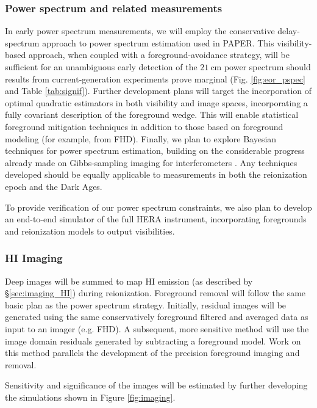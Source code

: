 \documentclass[preprint]{aastex}
\newcommand{\compress}{\vspace{-0.3in}}
\begin{document}

\compress
\subsubsection{Power spectrum and related measurements}

In early power spectrum measurements, we will employ the conservative delay-spectrum approach to power spectrum estimation used in PAPER.  This visibility-based approach, when coupled with a foreground-avoidance strategy, will be sufficient for an unambiguous early detection of the $21~\textrm{cm}$ power spectrum should results from current-generation experiments prove marginal (Fig. \ref{fig:eor_pspec} and Table \ref{tab:signif}).  Further development plans will target the incorporation of optimal quadratic estimators \citep{liu_tegmark2011,dillon_et_al2013a} in both visibility and image spaces, incorporating a fully covariant description of the foreground wedge.  This will enable statistical foreground mitigation techniques in addition to those based on foreground modeling (for example, from FHD).  Finally, we plan to explore Bayesian techniques for power spectrum estimation, building on the considerable progress already made on Gibbs-sampling imaging for interferometers \cite{sutter_et_al2014}.  Any 
techniques developed should be equally applicable to measurements in both the reionization epoch and the Dark Ages.

To provide verification of our power spectrum constraints, we also plan to develop an end-to-end simulator of the full HERA instrument, incorporating foregrounds and reionization models to output visibilities.

\compress
\subsubsection{HI Imaging}
Deep images will be summed to map HI emission (as described by \S\ref{sec:imaging_HI}) during reionization.   Foreground removal will follow the same basic plan as the power spectrum strategy.  Initially, residual images will be generated using the same conservatively foreground filtered and averaged data as input to an imager (e.g. FHD).  A subsequent, more sensitive method will use the image domain residuals generated by subtracting a foreground model.  Work on this method parallels the development of the precision foreground imaging and removal.

Sensitivity and significance of the images will be estimated by further developing the simulations shown in Figure \ref{fig:imaging}.  
\end{document}
